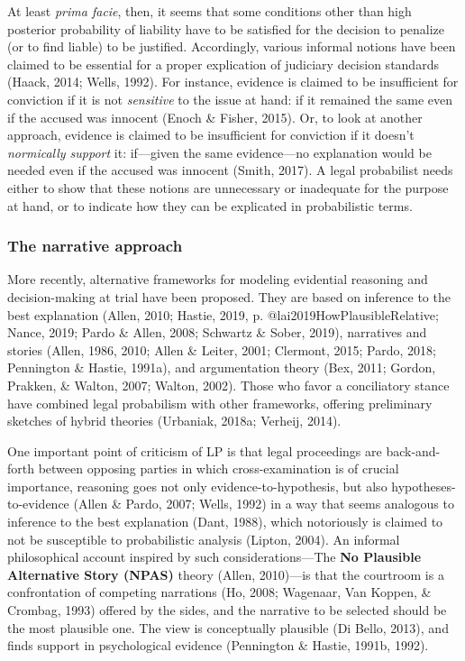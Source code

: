 \documentclass[11pt,dvipsnames,enabledeprecatedfontcommands]{scrartcl}
\begin{document}
At least \emph{prima facie}, then, it seems that some conditions other
than high posterior probability of liability have to be satisfied for
the decision to penalize (or to find liable) to be justified.
Accordingly, various informal notions have been claimed to be essential
for a proper explication of judiciary decision standards (Haack, 2014;
Wells, 1992). For instance, evidence is claimed to be insufficient for
conviction if it is not \emph{sensitive} to the issue at hand: if it
remained the same even if the accused was innocent (Enoch \& Fisher,
2015). Or, to look at another approach, evidence is claimed to be
insufficient for conviction if it doesn't \emph{normically support} it:
if---given the same evidence---no explanation would be needed even if
the accused was innocent (Smith, 2017). A legal probabilist needs either
to show that these notions are unnecessary or inadequate for the purpose
at hand, or to indicate how they can be explicated in probabilistic
terms.

\hypertarget{the-narrative-approach}{%
\subsubsection{The narrative approach}\label{the-narrative-approach}}

More recently, alternative frameworks for modeling evidential reasoning
and decision-making at trial have been proposed. They are based on
inference to the best explanation (Allen, 2010; Hastie, 2019, p.
@lai2019HowPlausibleRelative; Nance, 2019; Pardo \& Allen, 2008;
Schwartz \& Sober, 2019), narratives and stories (Allen, 1986, 2010;
Allen \& Leiter, 2001; Clermont, 2015; Pardo, 2018; Pennington \&
Hastie, 1991a), and argumentation theory (Bex, 2011; Gordon, Prakken, \&
Walton, 2007; Walton, 2002). Those who favor a conciliatory stance have
combined legal probabilism with other frameworks, offering preliminary
sketches of hybrid theories (Urbaniak, 2018a; Verheij, 2014).

One important point of criticism of LP is that legal proceedings are
back-and-forth between opposing parties in which cross-examination is of
crucial importance, reasoning goes not only evidence-to-hypothesis, but
also hypotheses-to-evidence (Allen \& Pardo, 2007; Wells, 1992) in a way
that seems analogous to inference to the best explanation (Dant, 1988),
which notoriously is claimed to not be susceptible to probabilistic
analysis (Lipton, 2004). An informal philosophical account inspired by
such considerations---The \textbf{No Plausible Alternative Story (NPAS)}
theory (Allen, 2010)---is that the courtroom is a confrontation of
competing narrations (Ho, 2008; Wagenaar, Van Koppen, \& Crombag, 1993)
offered by the sides, and the narrative to be selected should be the
most plausible one. The view is conceptually plausible (Di Bello, 2013),
and finds support in psychological evidence (Pennington \& Hastie,
1991b, 1992).
\end{document}
